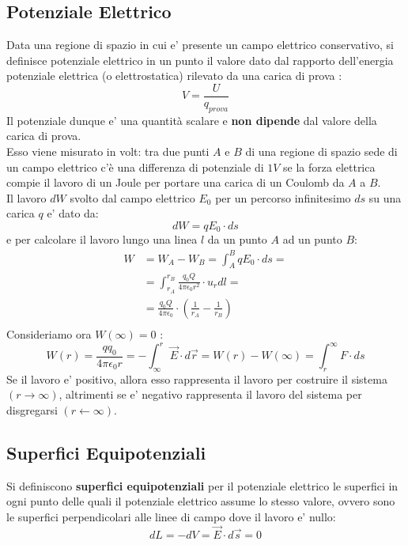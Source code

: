 \documentclass[a4paper, 10pt]{article}
\begin{document}
	    	\subsection{Potenziale Elettrico}
	    		Data una regione di spazio in cui e' presente un campo elettrico conservativo, si definisce potenziale elettrico
	    		in un punto il valore dato dal rapporto dell'energia potenziale elettrica (o elettrostatica) rilevato da una
	    		carica di prova : 
	    		\[ V = \frac{U}{q_{prova}} \]
	    		Il potenziale dunque e' una quantità scalare e \textbf{non dipende} dal valore della carica di prova. \\
	    		Esso viene misurato in volt: tra due punti $A$ e $B$ di una regione di spazio sede di un campo elettrico c'è una
	    		differenza di potenziale di $1V$ se la forza elettrica compie il lavoro di un Joule per portare una carica di 
	    		un Coulomb da $A$ a $B$. \\
	    		Il lavoro $dW$ svolto dal campo elettrico $E_0$ per un percorso infinitesimo $ds$ su una carica $q$ e' dato da:
	    		\[ dW = qE_0 \cdot ds \]
	    		e per calcolare il lavoro lungo una linea $l$ da un punto $A$ ad un punto $B$:
	    		\begin{equation*}
	    			\begin{split}
	    			 	W &= W_A - W_B = \int_{A}^{B} qE_0 \cdot ds = \\
	    			 	  &= \int_{r_A}^{r_B} \frac{q_0 Q}{4 \pi \epsilon_0 r^2} \cdot u_r dl = \\
	    			 	  &= \frac{q_0 Q}{4 \pi \epsilon_0} \cdot (\frac{1}{r_A} - \frac{1}{r_B}) \\
	    			\end{split}
			\end{equation*}	    		
	    		Consideriamo ora  $W(\infty) = 0$ : 
	    		\[ W(r) = \frac{q q_0}{4 \pi \epsilon_0 r} = -\int_{\infty}^{r} \overrightarrow{E} \cdot d\overrightarrow{r} = 
	    		W(r) - W(\infty) = \int_{r}^{\infty} F \cdot ds \]
	    		Se il lavoro e' positivo, allora  esso rappresenta il lavoro per costruire il sistema $(r \rightarrow \infty)$, 
	    		altrimenti se e' negativo rappresenta il lavoro del sistema per disgregarsi $(r \leftarrow \infty)$.
	    	\subsection{Superfici Equipotenziali}
	    		Si definiscono \textbf{superfici equipotenziali} per il potenziale elettrico le superfici in ogni 
	    		punto delle quali il potenziale elettrico assume lo stesso valore, ovvero 
	    		sono le superfici perpendicolari alle linee di campo dove il lavoro e' nullo:
	    		\[ dL = - dV = \overrightarrow{E} \cdot d \overrightarrow{s} = 0 \]
\end{document}
